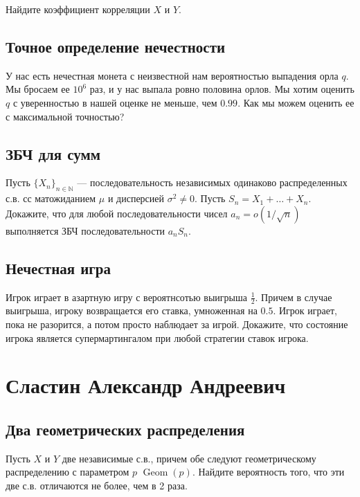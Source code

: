 \documentclass[12pt]{article}
\newcommand\N{\mathbb{N}}
\DeclareMathOperator{\Geom}{Geom}
\begin{document}
Найдите коэффициент корреляции $X$ и $Y$.



\subsection{Точное определение нечестности}

У нас есть нечестная монета с неизвестной нам вероятностью выпадения орла $q$. Мы бросаем ее $10^6$ раз, и у нас выпала ровно половина орлов. Мы хотим оценить $q$ с уверенностью в нашей оценке не меньше, чем $0.99$. Как мы можем оценить ее с максимальной точностью? 



\subsection{ЗБЧ для сумм}
Пусть $\{X_n\}_{n \in \N}$ --- последовательность независимых одинаково распределенных с.в. сс матожиданием $\mu$ и дисперсией $\sigma^2 \ne 0$. Пусть $S_n = X_1 + \dots + X_n$. Докажите, что для любой последовательности чисел $a_n = o(1/\sqrt{n})$ выполняется ЗБЧ последовательности $a_n S_n$.



\subsection{Нечестная игра}

Игрок играет в азартную игру с вероятнсотью выигрыша $\frac{1}{2}$. Причем в случае выигрыша, игроку возвращается его ставка, умноженная на $0.5$. Игрок играет, пока не разорится, а потом просто наблюдает за игрой. Докажите, что состояние игрока является супермартингалом при любой стратегии ставок игрока.



\newpage
\section{Сластин Александр Андреевич}

\subsection{Два геометрических распределения}

Пусть $X$ и $Y$ две независимые с.в., причем обе следуют геометрическому распределению с параметром $p$ $\Geom(p)$. Найдите вероятность того, что эти две с.в. отличаются не более, чем в 2 раза.
\end{document}
